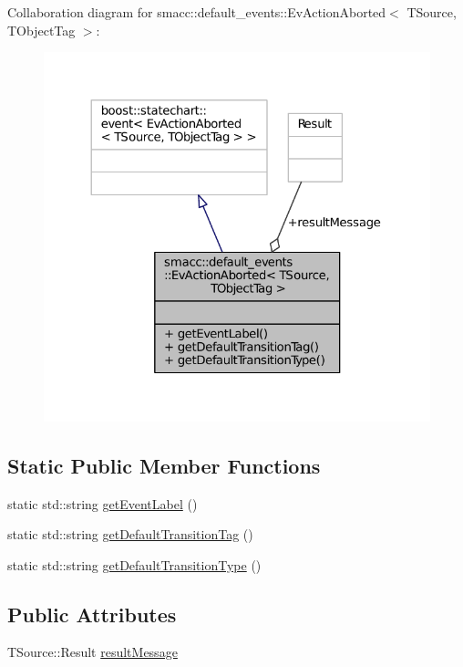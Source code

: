 Collaboration diagram for smacc\+:\+:default\+\_\+events\+:\+:Ev\+Action\+Aborted$<$ T\+Source, T\+Object\+Tag $>$\+:
\nopagebreak
\begin{figure}[H]
\begin{center}
\leavevmode
\includegraphics[width=324pt]{structsmacc_1_1default__events_1_1EvActionAborted__coll__graph}
\end{center}
\end{figure}
\subsection*{Static Public Member Functions}
\begin{DoxyCompactItemize}
\item 
static std\+::string \hyperlink{structsmacc_1_1default__events_1_1EvActionAborted_ae3613f85ce29214e061ea2677a4d28e1}{get\+Event\+Label} ()
\item 
static std\+::string \hyperlink{structsmacc_1_1default__events_1_1EvActionAborted_ad31e4437f0d30bf59589c28590a1edaa}{get\+Default\+Transition\+Tag} ()
\item 
static std\+::string \hyperlink{structsmacc_1_1default__events_1_1EvActionAborted_abb8137180081b5cce72398b81cc95fc5}{get\+Default\+Transition\+Type} ()
\end{DoxyCompactItemize}
\subsection*{Public Attributes}
\begin{DoxyCompactItemize}
\item 
T\+Source\+::\+Result \hyperlink{structsmacc_1_1default__events_1_1EvActionAborted_a0cd103e20d922ab5039022b67fffd5f7}{result\+Message}
\end{DoxyCompactItemize}


